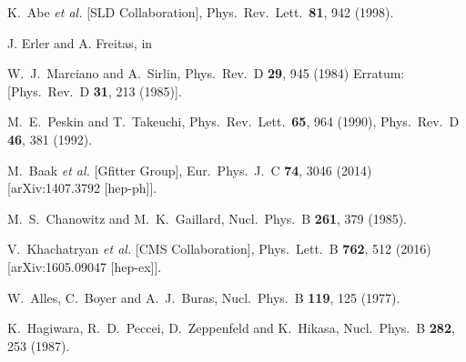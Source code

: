\documentclass[12pt]{article}
\begin{document}
\begin{thebibliography}{99}
  K.~Abe {\it et al.} [SLD Collaboration],
  Phys.\ Rev.\ Lett.\  {\bf 81}, 942 (1998).


J. Erler and A. Freitas, in \cite{PDG}

 W.~J.~Marciano and A.~Sirlin,
  Phys.\ Rev.\ D {\bf 29}, 945 (1984)
  Erratum: [Phys.\ Rev.\ D {\bf 31}, 213 (1985)].
 


 M.~E.~Peskin and T.~Takeuchi,
  Phys.\ Rev.\ Lett.\  {\bf 65}, 964 (1990),
  Phys.\ Rev.\ D {\bf 46}, 381 (1992).

 M.~Baak {\it et al.} [Gfitter Group],
  Eur.\ Phys.\ J.\ C {\bf 74}, 3046 (2014)
  [arXiv:1407.3792 [hep-ph]].


 M.~S.~Chanowitz and M.~K.~Gaillard,
  Nucl.\ Phys.\ B {\bf 261}, 379 (1985).


  V.~Khachatryan {\it et al.} [CMS Collaboration],
  Phys.\ Lett.\ B {\bf 762}, 512 (2016)
  [arXiv:1605.09047 [hep-ex]].



 W.~Alles, C.~Boyer and A.~J.~Buras,
  Nucl.\ Phys.\ B {\bf 119}, 125 (1977).



 K.~Hagiwara, R.~D.~Peccei, D.~Zeppenfeld and K.~Hikasa,
  Nucl.\ Phys.\ B {\bf 282}, 253 (1987).


\end{thebibliography}
\end{document}
